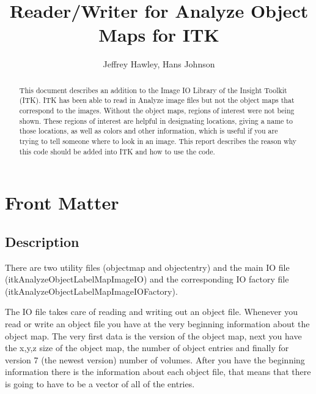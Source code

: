 \documentclass{InsightArticle}
\title{Reader/Writer for Analyze Object Maps for ITK}
\author{Jeffrey Hawley, Hans Johnson }
\begin{document}
\ifpdf
\else
\fi


\maketitle


\ifhtml
\chapter*{Front Matter\label{front}}
\fi


\begin{abstract}
\noindent
This document describes an addition to the Image IO Library of the Insight Toolkit (ITK).
ITK has been able to read in Analyze image files but not the object maps that correspond
to the images.  Without the object maps, regions of interest were not being shown.
These regions of interest are helpful in designating locations, giving a name to those
locations, as well as colors and other information, which is useful if you are trying to tell
someone where to look in an image.  This report describes the reason why this code should be
added into ITK and how to use the code.
\end{abstract}

\tableofcontents

\section{Description}
There are two utility files (objectmap and objectentry) and the main IO file (itkAnalyzeObjectLabelMapImageIO) and the corresponding
IO factory file (itkAnalyzeObjectLabelMapImageIOFactory).  

The IO file takes care of reading and writing out an object file.  Whenever
you read or write an object file you have at the very beginning information about the object map.  The very first data is the version
of the object map, next you have the x,y,z size of the object map, the number of object entries and finally for version 7 (the newest
version) number of volumes.  After you have the beginning information there is the information about each object file, that means that
there is going to have to be a vector of all of the entries.  
\end{document}
